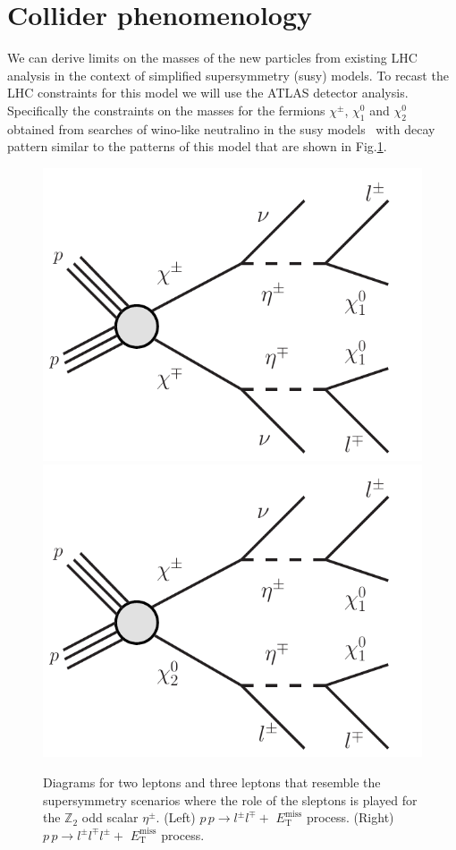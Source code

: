 \documentclass[12pt,letterpaper]{article}
\begin{document}
\section{Collider phenomenology}
\label{sec:collider}
%
We can derive limits on the masses of the new particles from existing LHC analysis in the context of simplified supersymmetry (susy) models. 
To recast the LHC constraints for this model we will use the ATLAS detector analysis. Specifically the constraints on the masses for the fermions $\chi^{\pm}$, $\chi_1^0$ and  $\chi_2^0$ obtained from searches of wino-like neutralino in the susy models~\cite{Aaboud:2018jiw} with decay pattern similar to the patterns of this model that are shown in Fig.\ref{fig:collider-diagrams}.
%
\begin{figure}[h]
\begin{center}
\includegraphics[scale=0.6]{chi1chi1}
\includegraphics[scale=0.6]{chi1chi20}
\caption{Diagrams for two leptons and three leptons that resemble the supersymmetry scenarios where the role of the sleptons is played for the  $\mathbb{Z}_2$ odd scalar $\eta^{\pm}$. (Left) $p\,p \to l^{\pm}l^{\mp}+$ $E_{\text{T}}^{\text{miss}}$ process. (Right) $p\,p \to l^{\pm}l^{\mp}l^{\pm}+$ $E_{\text{T}}^{\text{miss}}$ process. }
\label{fig:collider-diagrams}
\end{center}
\end{figure}
\end{document}

